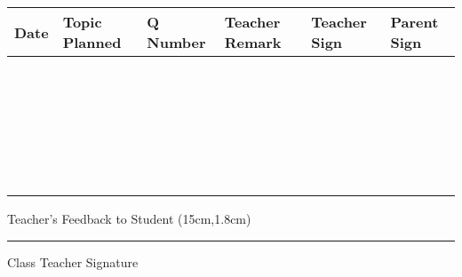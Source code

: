 \documentclass{article}%
\begin{document}
\begin{longtable}{| l | l| l | l | l | l |}%
\hline%
Date&Topic Planned&Q Number&Teacher Remark&Teacher Sign&Parent Sign\\%
\hline%
\endhead%
\hline%
 & & & & & \\[1.5ex]%
\hline%
 & & & & & \\[1.5ex]%
\hline%
 & & & & & \\[1.5ex]%
\hline%
 & & & & & \\[1.5ex]%
\hline%
 & & & & & \\[1.5ex]%
\hline%
 & & & & & \\[1.5ex]%
\hline%
 & & & & & \\[1.5ex]%
\hline%
 & & & & & \\[1.5ex]%
\hline%
 & & & & & \\[1.5ex]%
\hline%
 & & & & & \\[1.5ex]%
\hline%
 & & & & & \\[1.5ex]%
\hline%
 & & & & & \\[1.5ex]%
\hline%
 & & & & & \\[1.5ex]%
\hline%
 & & & & & \\[1.5ex]%
\hline%
 & & & & & \\[1.5ex]%
\hline%
 & & & & & \\[1.5ex]%
\hline%
 & & & & & \\[1.5ex]%
\hline%
 & & & & & \\[1.5ex]%
\hline%
 & & & & & \\[1.5ex]%
\hline%
 & & & & & \\[1.5ex]%
\hline%
 & & & & & \\[1.5ex]%
\hline%
 & & & & & \\[1.5ex]%
\hline%
 & & & & & \\[1.5ex]%
\hline%
 & & & & & \\[1.5ex]%
\hline%
 & & & & & \\[1.5ex]%
\hline%
 & & & & & \\[1.5ex]%
\hline%
\end{longtable}%
Teacher's Feedback to Student%
\linebreak%
\linebreak%
\framebox(15cm,1.8cm){}
\linebreak%
\linebreak%
\linebreak%
\linebreak%
\begin{minipage}[l]{0.45\textwidth}%
\flushleft%
\centering%
\par\noindent\rule{40mm}{0.4pt} \linebreak Class Teacher Signature%
\end{minipage}%
\end{document}
